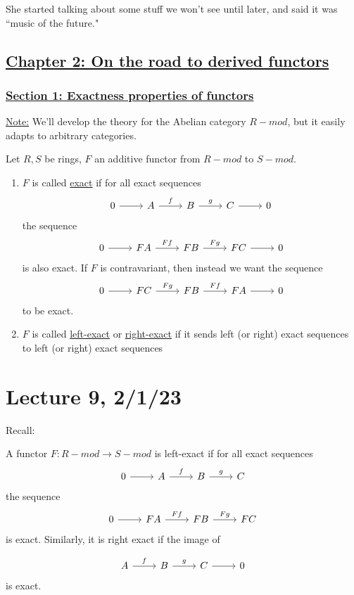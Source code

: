 \documentclass[x11names,reqno,14pt]{extarticle}
\begin{document}
She started talking about some stuff we won't see until later, and said it was ``music of the future." 

\subsection*{\underline{Chapter 2: On the road to derived functors}}

\subsubsection*{\underline{Section 1: Exactness properties of functors}}

\underline{Note:} We'll develop the theory for the Abelian category $R-mod$, but it easily adapts to arbitrary categories. 


Let $R, S$ be rings, $F$ an additive functor from $R-mod$ to $S-mod$. 

\begin{enumerate}

\item $F$ is called \underline{exact} if for all exact sequences
\[
\exactshort{A}{f}{B}{g}{C}
\]
the sequence
\[
\exactshort{FA}{Ff}{FB}{Fg}{FC}
\]
is also exact. If $F$ is contravariant, then instead we want the sequence
\[
\exactshort{FC}{Fg}{FB}{Ff}{FA}
\]
to be exact. 

\item $F$ is called \underline{left-exact} or \underline{right-exact} if it sends left (or right) exact sequences to left (or right) exact sequences


\end{enumerate}

\section*{Lecture 9, 2/1/23}

Recall: 

A functor $F:R-mod\to S-mod$ is left-exact if for all exact sequences
\[
\begin{tikzcd}
0 \ar[r] & A\ar[r, "f"] & B \ar[r, "g"] & C
\end{tikzcd}
\]
the sequence
\[
\begin{tikzcd}
0 \ar[r] & FA\ar[r, "Ff"] & FB \ar[r, "Fg"] & FC
\end{tikzcd}
\]
is exact. Similarly, it is right exact if the image of

\[
\begin{tikzcd}
A\ar[r, "f"] & B \ar[r, "g"] & C\ar[r]&0
\end{tikzcd}
\]
is exact. 
\end{document}
